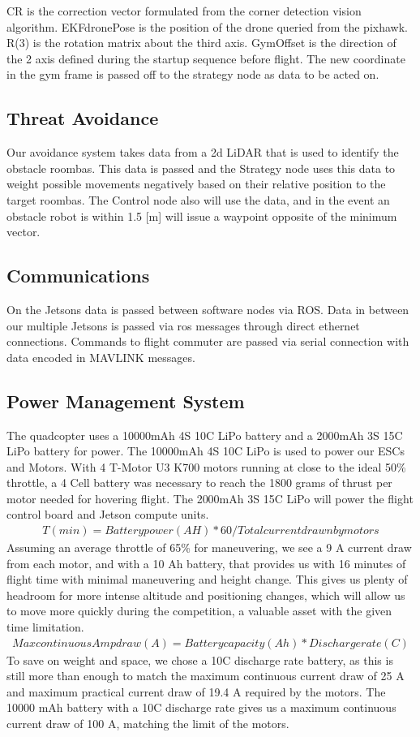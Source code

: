 \documentclass[12pt,letterpaper]{article}
\begin{document}
		CR is the correction vector formulated from the corner detection vision algorithm. EKFdronePose is the position of the drone queried from the pixhawk. R(3) is the rotation matrix about the third axis. GymOffset is the direction of the 2 axis defined during the startup sequence before flight. The new coordinate in the gym frame is passed off to the strategy node as data to be acted on. 
	\subsection*{Threat Avoidance}
		Our avoidance system takes data from a 2d LiDAR that is used to identify the obstacle roombas. This data is passed and the Strategy node uses this data to weight possible movements negatively based on their relative position to the target roombas. The Control node also will use the data, and in the event an obstacle robot is within 1.5 [m] will issue a waypoint opposite of the minimum vector.

	\subsection*{Communications}
		On the Jetsons data is passed between software nodes via ROS. Data in between our multiple Jetsons is passed via ros messages through direct ethernet connections. Commands to flight commuter are passed via serial connection with data encoded in MAVLINK messages. 


	\subsection*{Power Management System}
		The quadcopter uses  a 10000mAh 4S 10C LiPo battery and a 2000mAh 3S 15C LiPo battery for power. The 10000mAh 4S 10C LiPo is used to power our ESCs and Motors. With 4 T-Motor U3 K700 motors running at close to the ideal 50\% throttle, a 4 Cell battery was necessary to reach the 1800 grams of thrust per motor needed for hovering flight. The 2000mAh 3S 15C LiPo will power the flight control board and Jetson compute units.
		\begin{align*}
		T(min)=Battery power(AH)*60/Total current drawn by motors
		\end{align*}
		Assuming an average throttle of 65\% for maneuvering, we see a 9 A current draw from each motor, and with a 10 Ah battery, that provides us with 16 minutes of flight time with minimal maneuvering and height change. This gives us plenty of headroom for more intense altitude and positioning changes, which will allow us to move more quickly during the competition, a valuable asset with the given time limitation. 
		\begin{align*}
		Max continuous Amp draw (A) = Battery capacity (Ah) * Discharge rate (C)
		\end{align*}
		To save on weight and space, we chose a 10C discharge rate battery, as this is still more than enough to match the maximum continuous current draw of 25 A and maximum practical current draw of 19.4 A required by the motors. The 10000 mAh battery with a 10C discharge rate gives us a maximum continuous current draw of 100 A, matching the limit of the motors.
\end{document}
